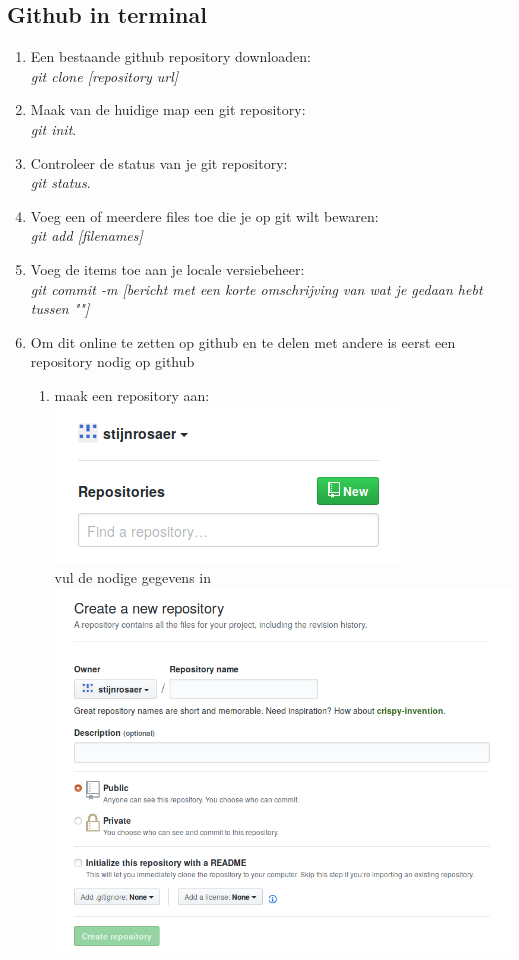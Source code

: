 \documentclass[a4paper]{article}
\begin{document}
		\subsection{Github in terminal}
			\begin{enumerate}
				\item Een bestaande github repository downloaden:\\ \textit{git clone [repository url]}
				\item Maak van de huidige map een git repository:\\ \textit{git init}.
				\item Controleer de status van je git repository:\\ \textit{git status}.
				\item Voeg een of meerdere files toe die je op git wilt bewaren:\\ \textit{git add [filenames]}
				\item Voeg de items toe aan je locale versiebeheer:\\ \textit{git commit -m [bericht met een korte omschrijving van wat je gedaan hebt tussen ""]}
				\item Om dit online te zetten op github en te delen met andere is eerst een repository nodig op github
				\begin{enumerate}
					\item maak een repository aan:\\ \includegraphics[scale=0.3]{img/maakrepo}\\ vul de nodige gegevens in\\ \includegraphics[scale=0.2]{img/maakrepo2}

\end{enumerate}
\end{enumerate}
\end{document}
